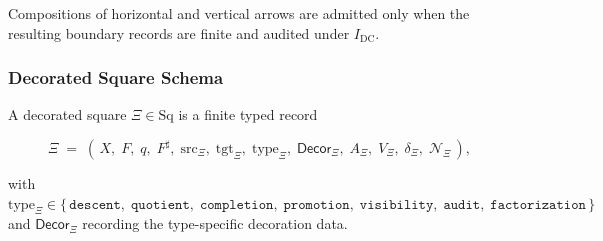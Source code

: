 \documentclass[11pt]{article}
\theoremstyle{definition}
\begin{document}
Compositions of horizontal and vertical arrows are admitted only when the resulting boundary records are finite and audited under \(I_{\mathrm{DC}}\).

\subsubsection{Decorated Square Schema}

A decorated square \(\Xi\in\mathrm{Sq}\) is a finite typed record

\[
\Xi\;=\;(\,X,\;F,\;q,\;F^{\sharp},\;\mathrm{src}_{\Xi},\;\mathrm{tgt}_{\Xi},\;\mathrm{type}_{\Xi},\;\mathsf{Decor}_{\Xi},\;A_{\Xi},\;V_{\Xi},\;\delta_{\Xi},\;\mathcal N_{\Xi}\,),
\]

with \(\mathrm{type}_{\Xi}\in\{\,\texttt{descent},\;\texttt{quotient},\;\texttt{completion},\;\texttt{promotion},\;\texttt{visibility},\;\texttt{audit},\;\texttt{factorization}\,\}\) and \(\mathsf{Decor}_{\Xi}\) recording the type-specific decoration data.
\end{document}
